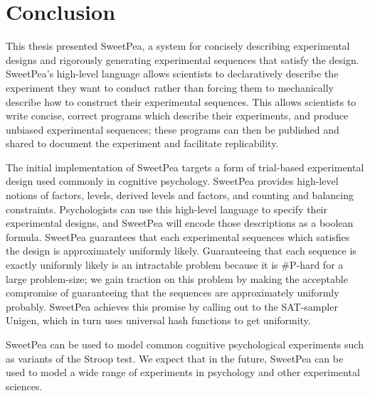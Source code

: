 \chapter{Conclusion}

This thesis presented SweetPea, a system for concisely describing experimental designs and rigorously generating experimental sequences that satisfy the design. SweetPea's high-level language allows scientists to declaratively describe the experiment they want to conduct rather than forcing them to mechanically describe how to construct their experimental sequences. This allows scientists to write concise, correct programs which describe their experiments, and produce unbiased experimental sequences; these programs can then be published and shared to document the experiment and facilitate replicability.

The initial implementation of SweetPea targets a form of trial-based experimental design used commonly in cognitive psychology. SweetPea provides high-level notions of factors, levels, derived levels and factors, and counting and balancing constraints. Psychologists can use this high-level language to specify their experimental designs, and SweetPea will encode those descriptions as a boolean formula. SweetPea guarantees that each experimental sequences which satisfies the design is approximately uniformly likely. Guaranteeing that each sequence is exactly uniformly likely is an intractable problem because it is \#P-hard for a large problem-size; we gain traction on this problem by making the acceptable compromise of guaranteeing that the sequences are approximately uniformly probably. SweetPea achieves this promise by calling out to the SAT-sampler Unigen, which in turn uses universal hash functions to get uniformity.

SweetPea can be used to model common cognitive psychological experiments such as variants of the Stroop test. We expect that in the future, SweetPea can be used to model a wide range of experiments in psychology and other experimental sciences.
